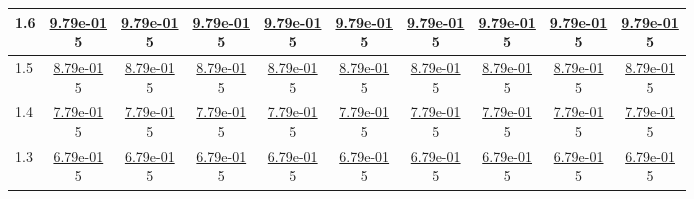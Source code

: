 \begin{table}[H]
\begin{tabular}{|l||c|c|c|c|c|c|c|c|c|}
\hline
 1.6 & \makecell{\ul{9.79e-01} \\ 5} & \makecell{\ul{9.79e-01} \\ 5} & \makecell{\ul{9.79e-01} \\ 5} & \makecell{\ul{9.79e-01} \\ 5} & \makecell{\ul{9.79e-01} \\ 5} & \makecell{\ul{9.79e-01} \\ 5} & \makecell{\ul{9.79e-01} \\ 5} & \makecell{\ul{9.79e-01} \\ 5} & \makecell{\ul{9.79e-01} \\ 5} \\
\hline
 1.5 & \makecell{\ul{8.79e-01} \\ 5} & \makecell{\ul{8.79e-01} \\ 5} & \makecell{\ul{8.79e-01} \\ 5} & \makecell{\ul{8.79e-01} \\ 5} & \makecell{\ul{8.79e-01} \\ 5} & \makecell{\ul{8.79e-01} \\ 5} & \makecell{\ul{8.79e-01} \\ 5} & \makecell{\ul{8.79e-01} \\ 5} & \makecell{\ul{8.79e-01} \\ 5} \\
\hline
 1.4 & \makecell{\ul{7.79e-01} \\ 5} & \makecell{\ul{7.79e-01} \\ 5} & \makecell{\ul{7.79e-01} \\ 5} & \makecell{\ul{7.79e-01} \\ 5} & \makecell{\ul{7.79e-01} \\ 5} & \makecell{\ul{7.79e-01} \\ 5} & \makecell{\ul{7.79e-01} \\ 5} & \makecell{\ul{7.79e-01} \\ 5} & \makecell{\ul{7.79e-01} \\ 5} \\
\hline
 1.3 & \makecell{\ul{6.79e-01} \\ 5} & \makecell{\ul{6.79e-01} \\ 5} & \makecell{\ul{6.79e-01} \\ 5} & \makecell{\ul{6.79e-01} \\ 5} & \makecell{\ul{6.79e-01} \\ 5} & \makecell{\ul{6.79e-01} \\ 5} & \makecell{\ul{6.79e-01} \\ 5} & \makecell{\ul{6.79e-01} \\ 5} & \makecell{\ul{6.79e-01} \\ 5} \\

\end{tabular}
\end{table}
